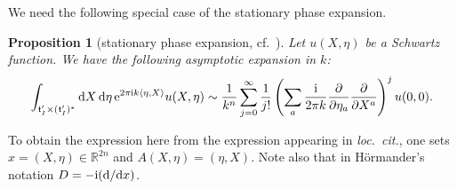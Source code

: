 \documentclass[pdftex]{sigma}
\numberwithin{equation}{section}
\newtheorem{Proposition}[Theorem]{Proposition}
{ \theoremstyle{definition}
\newtheorem{Definition}[Theorem]{Definition}
\newtheorem{Remark}[Theorem]{Remark} }
\newcommand{\pair}[2]{\langle #1, #2 \rangle}
\renewcommand{\i}{{\mathrm{i}}}
\def\t{\ensuremath{\mathfrak{t}}}
\def\bR{\ensuremath{\mathbb{R}}}
\begin{document}
We need the following special case of the stationary phase expansion.
\begin{Proposition}[{stationary phase expansion, cf.~\cite[Lemma 7.7.3]{Hormander1}}]
Let $u(X,\eta)$ be a Schwartz function. We have the following asymptotic expansion in $k$:
\[ \int_{\t_I^\prime \times (\t_I^\prime)^\ast}{\rm d}X\, {\rm d}\eta\, {\rm e}^{2\pi \i k\pair{\eta}{X}}u(X,\eta)\sim \frac{1}{k^n}\sum_{j=0}^\infty \frac{1}{j!} \left(\sum_a \frac{\i}{2\pi k}\frac{\partial}{\partial \eta_a}\frac{\partial}{\partial X^a}\right)^j u(0,0).\]
\end{Proposition}
\begin{Remark}
To obtain the expression here from the expression appearing in \emph{loc.\ cit.}, one sets $x=(X,\eta) \in \bR^{2n}$ and $A(X,\eta)=(\eta,X)$. Note also that in H{\"o}rmander's notation $D=-\i({\rm d}/{\rm d}x)$.
\end{Remark}
\end{document}
